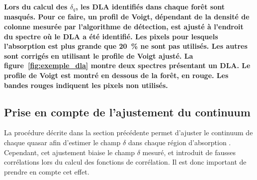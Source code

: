 \documentclass[11pt, twoside, a4paper, openright]{report}
\begin{document}
\textbf{Lors du calcul des $\delta_q$, les DLA identifiés dans chaque forêt sont masqués. Pour ce faire, un profil de Voigt, dépendant de la densité de colonne mesurée par l'algorithme de détection, est ajusté à l'endroit du spectre où le DLA a été identifié. Les pixels pour lesquels l'absorption est plus grande que \SI{20}{\percent} ne sont pas utilisés. Les autres sont corrigés en utilisant le profile de Voigt ajusté. La figure~\ref{fig:exemple_dla} montre deux spectres présentant un DLA. Le profile de Voigt est montré en dessous de la forêt, en rouge. Les bandes rouges indiquent les pixels non utilisés.}


\subsection{Prise en compte de l'ajustement du continuum}
\label{subsec:projdelta}
La procédure décrite dans la section précédente permet d'ajuster le continuum de chaque quasar afin d'estimer le champ $\delta$ dans chaque région d'absorption \lya{}. Cependant, cet ajustement biaise le champ $\delta$ mesuré, et introduit de fausses corrélations lors du calcul des fonctions de corrélation. Il est donc important de prendre en compte cet effet.
\end{document}
